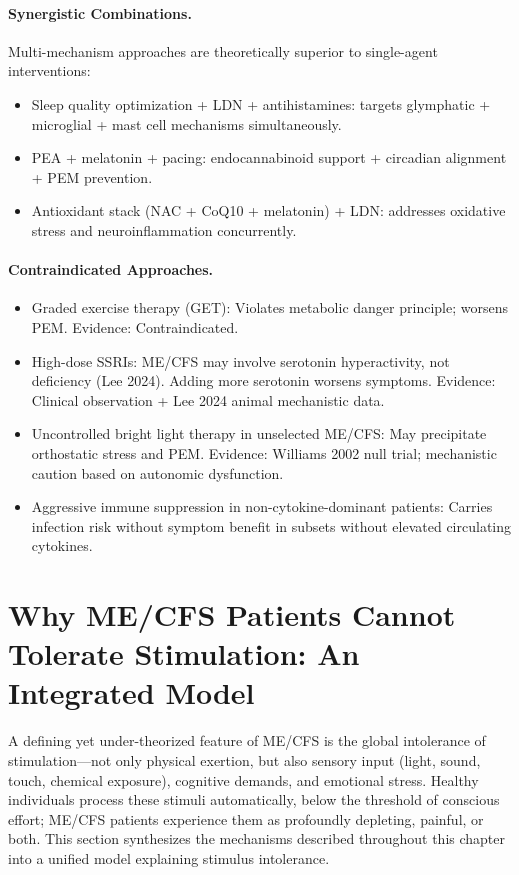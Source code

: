\paragraph{Synergistic Combinations.} Multi-mechanism approaches are theoretically superior to single-agent interventions:
\begin{itemize}
  \item Sleep quality optimization + LDN + antihistamines: targets glymphatic + microglial + mast cell mechanisms simultaneously.
  \item PEA + melatonin + pacing: endocannabinoid support + circadian alignment + PEM prevention.
  \item Antioxidant stack (NAC + CoQ10 + melatonin) + LDN: addresses oxidative stress and neuroinflammation concurrently.
\end{itemize}

\paragraph{Contraindicated Approaches.}
\begin{itemize}
  \item Graded exercise therapy (GET): Violates metabolic danger principle; worsens PEM. Evidence: Contraindicated.
  \item High-dose SSRIs: ME/CFS may involve serotonin hyperactivity, not deficiency (Lee 2024). Adding more serotonin worsens symptoms. Evidence: Clinical observation + Lee 2024 animal mechanistic data.
  \item Uncontrolled bright light therapy in unselected ME/CFS: May precipitate orthostatic stress and PEM. Evidence: Williams 2002 null trial; mechanistic caution based on autonomic dysfunction.
  \item Aggressive immune suppression in non-cytokine-dominant patients: Carries infection risk without symptom benefit in subsets without elevated circulating cytokines.
\end{itemize}


\section{Why ME/CFS Patients Cannot Tolerate Stimulation: An Integrated Model}
\label{sec:ch15-stimulation-intolerance}

A defining yet under-theorized feature of ME/CFS is the global intolerance of stimulation---not only physical exertion, but also sensory input (light, sound, touch, chemical exposure), cognitive demands, and emotional stress. Healthy individuals process these stimuli automatically, below the threshold of conscious effort; ME/CFS patients experience them as profoundly depleting, painful, or both. This section synthesizes the mechanisms described throughout this chapter into a unified model explaining stimulus intolerance.

